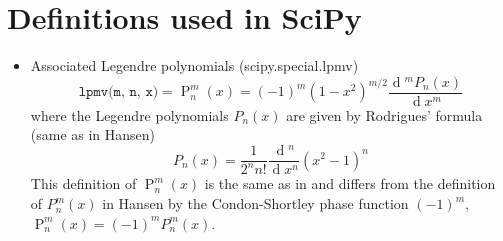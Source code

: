 \documentclass[a4paper,12pt]{article}
\newcommand{\diff}{\operatorname{d}\!}
\begin{document}
\section{Definitions used in SciPy}

\begin{itemize}
\item Associated Legendre polynomials (scipy.special.lpmv)
  \begin{equation}
    \texttt{lpmv(m, n, x)} = \operatorname{P}_{n}^{m}(x) = (-1)^{m}(1 - x^{2})^{m/2} \frac{\diff^{m}P_{n}(x)}{\diff x^{m}}
  \end{equation}
  where the Legendre polynomials $P_{n}(x)$ are given by Rodrigues'
  formula (same as in Hansen)
  \begin{equation}
    P_{n}(x) = \frac{1}{2^{n}n!}\frac{\diff^{n}}{\diff x^{n}}(x^{2} - 1)^{n}
  \end{equation}
  This definition of $\operatorname{P}_{n}^{m}(x)$ is the same as in
  \cite[8.6.6 and 8.6.18]{Abramowitz+Stegun1970} and differs from the
  definition of $P_{n}^{m}(x)$ in Hansen by the Condon-Shortley phase
  function $(-1)^{m}$,
  $\operatorname{P}_{n}^{m}(x) = (-1)^{m}P_{n}^{m}(x)$.


\end{itemize}
\end{document}
